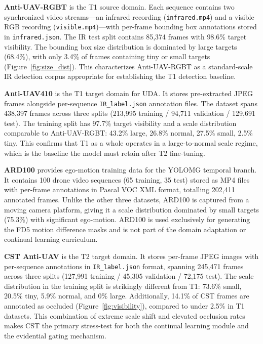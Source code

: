 \textbf{Anti-UAV-RGBT} \cite{jiang_anti-uav_2023} is the T1 source domain. Each sequence contains two synchronized video streams---an infrared recording (\texttt{infrared.mp4}) and a visible RGB recording (\texttt{visible.mp4})---with per-frame bounding box annotations stored in \texttt{infrared.json}. The IR test split contains 85,374 frames with 98.6\% target visibility. The bounding box size distribution is dominated by large targets (68.4\%), with only 3.4\% of frames containing tiny or small targets (Figure~\ref{fig:size_dist}). This characterizes Anti-UAV-RGBT as a standard-scale IR detection corpus appropriate for establishing the T1 detection baseline.

\textbf{Anti-UAV410} \cite{bohuang_410} is the T1 target domain for UDA. It stores pre-extracted JPEG frames alongside per-sequence \texttt{IR\_label.json} annotation files. The dataset spans 438,397 frames across three splits (213,995 training / 94,711 validation / 129,691 test). The training split has 97.7\% target visibility and a scale distribution comparable to Anti-UAV-RGBT: 43.2\% large, 26.8\% normal, 27.5\% small, 2.5\% tiny. This confirms that T1 as a whole operates in a large-to-normal scale regime, which is the baseline the model must retain after T2 fine-tuning.

\textbf{ARD100} provides ego-motion training data for the YOLOMG temporal branch. It contains 100 drone video sequences (65 training, 35 test) stored as MP4 files with per-frame annotations in Pascal VOC XML format, totalling 202,411 annotated frames. Unlike the other three datasets, ARD100 is captured from a moving camera platform, giving it a scale distribution dominated by small targets (75.3\%) with significant ego-motion. ARD100 is used exclusively for generating the FD5 motion difference masks and is not part of the domain adaptation or continual learning curriculum.

\textbf{CST Anti-UAV} \cite{xie2025cstantiuavthermalinfrared} is the T2 target domain. It stores per-frame JPEG images with per-sequence annotations in \texttt{IR\_label.json} format, spanning 245,471 frames across three splits (127,991 training / 45,305 validation / 72,175 test). The scale distribution in the training split is strikingly different from T1: 73.6\% small, 20.5\% tiny, 5.9\% normal, and 0\% large. Additionally, 14.1\% of CST frames are annotated as occluded (Figure~\ref{fig:visibility}), compared to under 2.5\% in T1 datasets. This combination of extreme scale shift and elevated occlusion rates makes CST the primary stress-test for both the continual learning module and the evidential gating mechanism.


